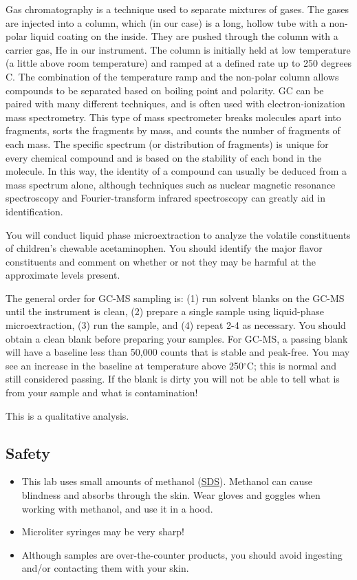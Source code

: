 \documentclass[]{tufte-book}
\providecommand{\tightlist}{%
  \setlength{\itemsep}{0pt}\setlength{\parskip}{0pt}}
\begin{document}
Gas chromatography is a technique used to separate mixtures of gases. The gases are injected into a column, which (in our case) is a long, hollow tube with a non-polar liquid coating on the inside. They are pushed through the column with a carrier gas, He in our instrument. The column is initially held at low temperature (a little above room temperature) and ramped at a defined rate up to 250 degrees C. The combination of the temperature ramp and the non-polar column allows compounds to be separated based on boiling point and polarity. GC can be paired with many different techniques, and is often used with electron-ionization mass spectrometry. This type of mass spectrometer breaks molecules apart into fragments, sorts the fragments by mass, and counts the number of fragments of each mass. The specific spectrum (or distribution of fragments) is unique for every chemical compound and is based on the stability of each bond in the molecule. In this way, the identity of a compound can usually be deduced from a mass spectrum alone, although techniques such as nuclear magnetic resonance spectroscopy and Fourier-transform infrared spectroscopy can greatly aid in identification.

You will conduct liquid phase microextraction to analyze the volatile constituents of children's chewable acetaminophen. You should identify the major flavor constituents and comment on whether or not they may be harmful at the approximate levels present.

The general order for GC-MS sampling is: (1) run solvent blanks on the GC-MS until the instrument is clean, (2) prepare a single sample using liquid-phase microextraction, (3) run the sample, and (4) repeat 2-4 as necessary. You should obtain a clean blank before preparing your samples. For GC-MS, a passing blank will have a baseline less than 50,000 counts that is stable and peak-free. You may see an increase in the baseline at temperature above 250\(^{\circ}\)C; this is normal and still considered passing. If the blank is dirty you will not be able to tell what is from your sample and what is contamination!

This is a qualitative analysis.

\hypertarget{safety-7}{%
\subsection*{Safety}\label{safety-7}}

\begin{itemize}
\tightlist
\item
  This lab uses small amounts of methanol (\href{http://www.sciencelab.com/msds.php?msdsId=9927227}{SDS}). Methanol can cause blindness and absorbs through the skin. Wear gloves and goggles when working with methanol, and use it in a hood.\\
\item
  Microliter syringes may be very sharp!\\
\item
  Although samples are over-the-counter products, you should avoid ingesting and/or contacting them with your skin.
\end{itemize}
\end{document}
